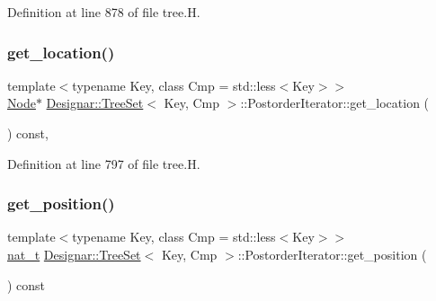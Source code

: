Definition at line 878 of file tree.\+H.

\mbox{\label{class_designar_1_1_tree_set_1_1_postorder_iterator_abd9ef4eeb3e56c101dbf32b15253b56e}} 
\subsubsection{\texorpdfstring{get\+\_\+location()}{get\_location()}}
{\footnotesize\ttfamily template$<$typename Key, class Cmp = std\+::less$<$\+Key$>$$>$ \\
\hyperlink{class_designar_1_1_tree_set_a7409a9c1545c0e9e2fd6b84120713c99}{Node}$\ast$ \hyperlink{class_designar_1_1_tree_set}{Designar\+::\+Tree\+Set}$<$ Key, Cmp $>$\+::Postorder\+Iterator\+::get\+\_\+location (\begin{DoxyParamCaption}{ }\end{DoxyParamCaption}) const\hspace{0.3cm}{\ttfamily [inline]}, {\ttfamily [protected]}}



Definition at line 797 of file tree.\+H.

\mbox{\label{class_designar_1_1_tree_set_1_1_postorder_iterator_a09170166eaa3f2dfa50975ea14d99270}} 
\subsubsection{\texorpdfstring{get\+\_\+position()}{get\_position()}}
{\footnotesize\ttfamily template$<$typename Key, class Cmp = std\+::less$<$\+Key$>$$>$ \\
\hyperlink{namespace_designar_aa72662848b9f4815e7bf31a7cf3e33d1}{nat\+\_\+t} \hyperlink{class_designar_1_1_tree_set}{Designar\+::\+Tree\+Set}$<$ Key, Cmp $>$\+::Postorder\+Iterator\+::get\+\_\+position (\begin{DoxyParamCaption}{ }\end{DoxyParamCaption}) const\hspace{0.3cm}{\ttfamily [inline]}}



